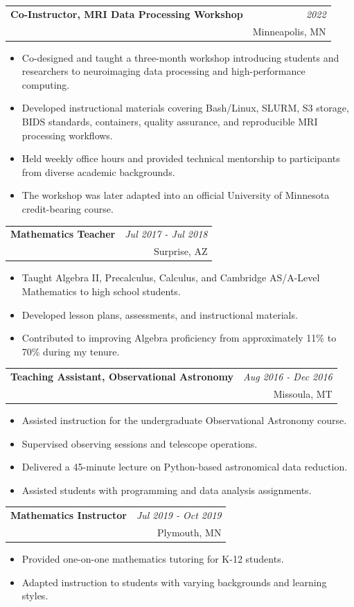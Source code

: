 \documentclass[a4paper,11pt]{article}
\makeatletter
\newcommand{\resumeExp}[4]{
\vspace{2mm}\item[]
    \begin{tabular*}{\textwidth}[t]{l@{\extracolsep{\fill}}r}
        \hspace{-4.4mm} \textbf{#1} \vspace{0mm} & {\footnotesize\emph{#3}}\vspace{0mm}\\
        \hspace{-4.3mm} \footnotesize{\text{#2}} \vspace{2mm} &\footnotesize{#4}
    \end{tabular*}
    \vspace{-6.1mm}
}
\newcommand{\resumeItemListStart}{\begin{justify}\begin{itemize}[leftmargin=3ex, rightmargin=2ex, noitemsep,labelsep=1.2mm,itemsep=0mm]\small}
\newcommand{\resumeItemListEnd}{\end{itemize}\end{justify}\vspace{-1.5mm}}
\makeatother
\begin{document}
\resumeExp
{Co-Instructor, MRI Data Processing Workshop}
{Masonic Institute for the Developing Brain, University of Minnesota}
{2022}
{Minneapolis, MN}
\resumeItemListStart
\item[$\bullet$] Co-designed and taught a three-month workshop introducing students and researchers to neuroimaging data processing and high-performance computing.
\item[$\bullet$] Developed instructional materials covering Bash/Linux, SLURM, S3 storage, BIDS standards, containers, quality assurance, and reproducible MRI processing workflows.
\item[$\bullet$] Held weekly office hours and provided technical mentorship to participants from diverse academic backgrounds.
\item[$\bullet$] The workshop was later adapted into an official University of Minnesota credit-bearing course.
\resumeItemListEnd

\resumeExp
{Mathematics Teacher}
{Imagine Prep Surprise}
{Jul 2017 - Jul 2018}
{Surprise, AZ}
\resumeItemListStart
\item[$\bullet$] Taught Algebra II, Precalculus, Calculus, and Cambridge AS/A-Level Mathematics to high school students.
\item[$\bullet$] Developed lesson plans, assessments, and instructional materials.
\item[$\bullet$] Contributed to improving Algebra proficiency from approximately 11\% to 70\% during my tenure.
\resumeItemListEnd

\resumeExp
{Teaching Assistant, Observational Astronomy}
{University of Montana}
{Aug 2016 - Dec 2016}
{Missoula, MT}
\resumeItemListStart
\item[$\bullet$] Assisted instruction for the undergraduate Observational Astronomy course.
\item[$\bullet$] Supervised observing sessions and telescope operations.
\item[$\bullet$] Delivered a 45-minute lecture on Python-based astronomical data reduction.
\item[$\bullet$] Assisted students with programming and data analysis assignments.
\resumeItemListEnd

\resumeExp
{Mathematics Instructor}
{Huntington Learning Center}
{Jul 2019 - Oct 2019}
{Plymouth, MN}
\resumeItemListStart
\item[$\bullet$] Provided one-on-one mathematics tutoring for K-12 students.
\item[$\bullet$] Adapted instruction to students with varying backgrounds and learning styles.
\resumeItemListEnd
\end{document}
